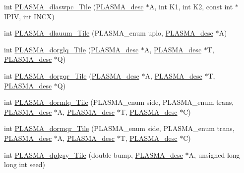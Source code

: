 \begin{DoxyCompactItemize}
\item 
int \hyperlink{group__double__Tile_ga2b9f87c9ca1c1de860156759f3d1e83c_ga2b9f87c9ca1c1de860156759f3d1e83c}{P\+L\+A\+S\+M\+A\+\_\+dlaswpc\+\_\+\+Tile} (\hyperlink{structplasma__desc__t}{P\+L\+A\+S\+M\+A\+\_\+desc} $\ast$A, int K1, int K2, const int $\ast$I\+P\+I\+V, int I\+N\+C\+X)
\item 
int \hyperlink{group__double__Tile_ga000ce9d736ce5fe3464b04695f8feabb_ga000ce9d736ce5fe3464b04695f8feabb}{P\+L\+A\+S\+M\+A\+\_\+dlauum\+\_\+\+Tile} (P\+L\+A\+S\+M\+A\+\_\+enum uplo, \hyperlink{structplasma__desc__t}{P\+L\+A\+S\+M\+A\+\_\+desc} $\ast$A)
\item 
int \hyperlink{group__double__Tile_ga228c24159ae82a0484e02b277bb4a275_ga228c24159ae82a0484e02b277bb4a275}{P\+L\+A\+S\+M\+A\+\_\+dorglq\+\_\+\+Tile} (\hyperlink{structplasma__desc__t}{P\+L\+A\+S\+M\+A\+\_\+desc} $\ast$A, \hyperlink{structplasma__desc__t}{P\+L\+A\+S\+M\+A\+\_\+desc} $\ast$T, \hyperlink{structplasma__desc__t}{P\+L\+A\+S\+M\+A\+\_\+desc} $\ast$Q)
\item 
int \hyperlink{group__double__Tile_gae246f76afc3683dcb4fd74c72da5791e_gae246f76afc3683dcb4fd74c72da5791e}{P\+L\+A\+S\+M\+A\+\_\+dorgqr\+\_\+\+Tile} (\hyperlink{structplasma__desc__t}{P\+L\+A\+S\+M\+A\+\_\+desc} $\ast$A, \hyperlink{structplasma__desc__t}{P\+L\+A\+S\+M\+A\+\_\+desc} $\ast$T, \hyperlink{structplasma__desc__t}{P\+L\+A\+S\+M\+A\+\_\+desc} $\ast$Q)
\item 
int \hyperlink{group__double__Tile_gadab91637fe96b50a3053a5ff5b334b2f_gadab91637fe96b50a3053a5ff5b334b2f}{P\+L\+A\+S\+M\+A\+\_\+dormlq\+\_\+\+Tile} (P\+L\+A\+S\+M\+A\+\_\+enum side, P\+L\+A\+S\+M\+A\+\_\+enum trans, \hyperlink{structplasma__desc__t}{P\+L\+A\+S\+M\+A\+\_\+desc} $\ast$A, \hyperlink{structplasma__desc__t}{P\+L\+A\+S\+M\+A\+\_\+desc} $\ast$T, \hyperlink{structplasma__desc__t}{P\+L\+A\+S\+M\+A\+\_\+desc} $\ast$C)
\item 
int \hyperlink{group__double__Tile_ga1371def6d97c0194d43a018f448013b6_ga1371def6d97c0194d43a018f448013b6}{P\+L\+A\+S\+M\+A\+\_\+dormqr\+\_\+\+Tile} (P\+L\+A\+S\+M\+A\+\_\+enum side, P\+L\+A\+S\+M\+A\+\_\+enum trans, \hyperlink{structplasma__desc__t}{P\+L\+A\+S\+M\+A\+\_\+desc} $\ast$A, \hyperlink{structplasma__desc__t}{P\+L\+A\+S\+M\+A\+\_\+desc} $\ast$T, \hyperlink{structplasma__desc__t}{P\+L\+A\+S\+M\+A\+\_\+desc} $\ast$C)
\item 
int \hyperlink{group__double__Tile_ga3a901945178a0ed94c62898c98a3fe90_ga3a901945178a0ed94c62898c98a3fe90}{P\+L\+A\+S\+M\+A\+\_\+dplgsy\+\_\+\+Tile} (double bump, \hyperlink{structplasma__desc__t}{P\+L\+A\+S\+M\+A\+\_\+desc} $\ast$A, unsigned long long int seed)

\end{DoxyCompactItemize}
